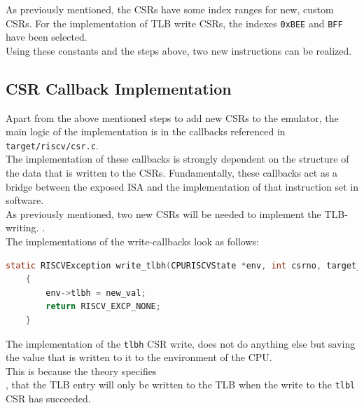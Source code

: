 As previously mentioned, the CSRs have some index ranges for new, custom CSRs. For the implementation
of TLB write CSRs, the indexes \texttt{0xBEE} and \texttt{BFF} have been selected.\\
Using these constants and the steps above, two new instructions can be realized.

\subsection{CSR Callback Implementation} Apart from the above mentioned steps to add new CSRs to the emulator, the
main logic of the implementation is in the callbacks referenced in \texttt{target/riscv/csr.c}.\\
The implementation of these callbacks is strongly dependent on the structure of the data that is written to
the CSRs. Fundamentally, these callbacks act as a bridge between the exposed ISA and the implementation of
that instruction set in software.\\
As previously mentioned, two new CSRs will be needed to implement the TLB-writing. .\\
The implementations
of the write-callbacks look as follows:



\begin{lstlisting}[language=c,float=h!,
    label={lst:tlbh}]
    static RISCVException write_tlbh(CPURISCVState *env, int csrno, target_ulong new_val)
    {
        env->tlbh = new_val;
        return RISCV_EXCP_NONE;
    }
\end{lstlisting}
The implementation of the \texttt{tlbh} CSR write, does not do anything else but saving the value
that is written to it to the environment of the CPU.\\
This is because the theory specifies\\, that the TLB entry will only
be written to the TLB when the write to the \texttt{tlbl} CSR has succeeded.

